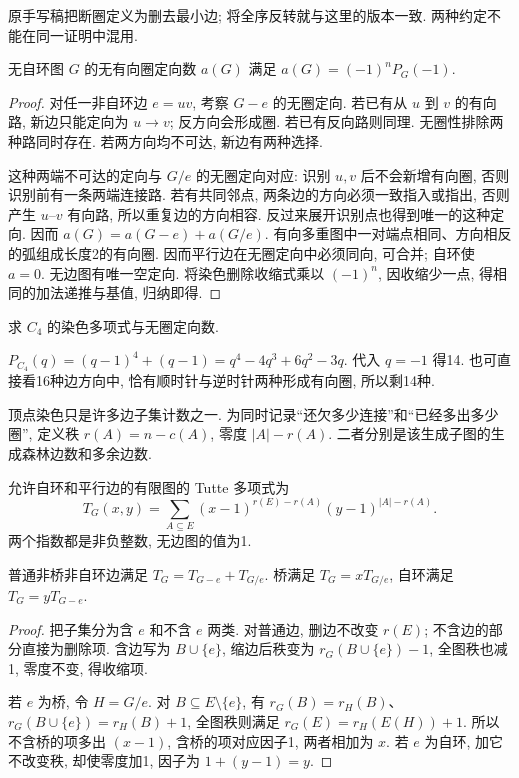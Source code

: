 原手写稿把断圈定义为删去最小边; 将全序反转就与这里的版本一致. 两种约定不能在同一证明中混用.
\begin{theorem}\label{thm:stanley}
无自环图 $G$ 的无有向圈定向数 $a(G)$ 满足 $a(G)=(-1)^nP_G(-1)$.
\end{theorem}
\begin{proof}
对任一非自环边 $e=uv$, 考察 $G-e$ 的无圈定向. 若已有从 $u$ 到 $v$ 的有向路, 新边只能定向为 $u\to v$; 反方向会形成圈. 若已有反向路则同理. 无圈性排除两种路同时存在. 若两方向均不可达, 新边有两种选择.

这种两端不可达的定向与 $G/e$ 的无圈定向对应: 识别 $u,v$ 后不会新增有向圈, 否则识别前有一条两端连接路. 若有共同邻点, 两条边的方向必须一致指入或指出, 否则产生 $u$--$v$ 有向路, 所以重复边的方向相容. 反过来展开识别点也得到唯一的这种定向. 因而 $a(G)=a(G-e)+a(G/e)$. 有向多重图中一对端点相同、方向相反的弧组成长度2的有向圈. 因而平行边在无圈定向中必须同向, 可合并; 自环使 $a=0$. 无边图有唯一空定向. 将染色删除收缩式乘以 $(-1)^n$, 因收缩少一点, 得相同的加法递推与基值, 归纳即得.
\end{proof}
\begin{example}
求 $C_4$ 的染色多项式与无圈定向数.
\end{example}
\begin{solution}
$P_{C_4}(q)=(q-1)^4+(q-1)=q^4-4q^3+6q^2-3q$. 代入 $q=-1$ 得14. 也可直接看16种边方向中, 恰有顺时针与逆时针两种形成有向圈, 所以剩14种.
\end{solution}
顶点染色只是许多边子集计数之一. 为同时记录“还欠多少连接”和“已经多出多少圈”, 定义秩 $r(A)=n-c(A)$, 零度 $|A|-r(A)$. 二者分别是该生成子图的生成森林边数和多余边数.
\begin{definition}
允许自环和平行边的有限图的 Tutte 多项式为
\[
T_G(x,y)=\sum_{A\subseteq E}(x-1)^{r(E)-r(A)}(y-1)^{|A|-r(A)}.
\]
两个指数都是非负整数, 无边图的值为1.
\end{definition}
\begin{theorem}\label{thm:tuttedel}
普通非桥非自环边满足 $T_G=T_{G-e}+T_{G/e}$. 桥满足 $T_G=xT_{G/e}$, 自环满足 $T_G=yT_{G-e}$.
\end{theorem}
\begin{proof}
把子集分为含 $e$ 和不含 $e$ 两类. 对普通边, 删边不改变 $r(E)$; 不含边的部分直接为删除项. 含边写为 $B\cup\{e\}$, 缩边后秩变为 $r_G(B\cup\{e\})-1$, 全图秩也减1, 零度不变, 得收缩项.

若 $e$ 为桥, 令 $H=G/e$. 对 $B\subseteq E\setminus\{e\}$, 有 $r_G(B)=r_H(B)$、$r_G(B\cup\{e\})=r_H(B)+1$, 全图秩则满足 $r_G(E)=r_H(E(H))+1$. 所以不含桥的项多出 $(x-1)$, 含桥的项对应因子1, 两者相加为 $x$. 若 $e$ 为自环, 加它不改变秩, 却使零度加1, 因子为 $1+(y-1)=y$.
\end{proof}
